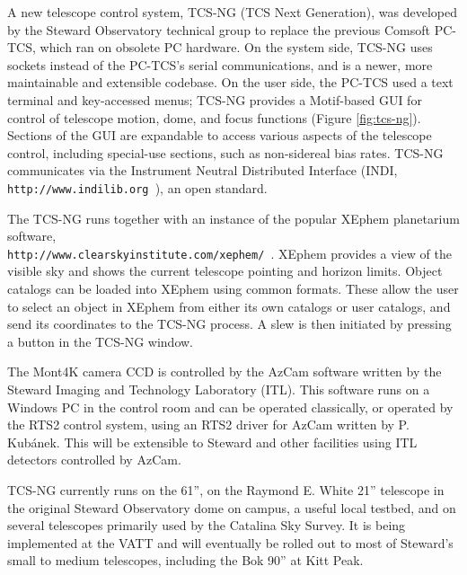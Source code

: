 \documentclass[]{spie}  %
\begin{document}
A new telescope control system, TCS-NG (TCS Next Generation), was developed by the Steward Observatory technical group to replace the previous Comsoft PC-TCS, which ran on obsolete PC hardware.  On the system side, TCS-NG uses sockets instead of the PC-TCS's serial communications, and is a newer, more maintainable and extensible codebase. On the user side, the PC-TCS used a text terminal and key-accessed menus; TCS-NG provides a Motif-based GUI for control of telescope motion, dome, and focus functions (Figure \ref{fig:tcs-ng}). Sections of the GUI are expandable to access various aspects of the telescope control, including special-use sections, such as non-sidereal bias rates. TCS-NG communicates via the Instrument Neutral Distributed Interface (INDI, {\tt http://www.indilib.org }), an open standard.

The TCS-NG runs together with an instance of the popular XEphem planetarium software,\\ {\tt http://www.clearskyinstitute.com/xephem/ }.  XEphem provides a view of the visible sky and shows the current telescope pointing and horizon limits. Object catalogs can be loaded into XEphem using common formats. These allow the user to select an object in XEphem from either its own catalogs or user catalogs, and send its coordinates to the TCS-NG process. A slew is then initiated by pressing a button in the TCS-NG window.  

The Mont4K camera CCD is controlled by the AzCam software written by the Steward Imaging and Technology Laboratory (ITL). This software runs on a Windows PC in the control room and can be operated classically, or operated by the RTS2 control system, using an RTS2 driver for AzCam written by P. Kub\'anek.  This will be extensible to Steward and other facilities using ITL detectors controlled by AzCam.

TCS-NG currently runs on the 61'', on the Raymond E. White 21'' telescope in the original Steward Observatory dome on campus, a useful local testbed, and on several telescopes primarily used by the Catalina Sky Survey. It is being implemented at the VATT and will eventually be rolled out to most of  Steward's small to medium telescopes, including the Bok 90'' at Kitt Peak.
\end{document}
